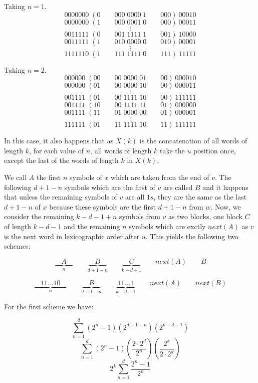 \documentclass[11pt,a4paper]{tesis}
\theoremstyle{definition}
\begin{document}
Taking $n = 1$.
$$0000000\; (0 \qquad 000 \; 0000 \; 1 \qquad 000) \: 00010$$
$$0000000\; (1 \qquad 000 \; 0001 \; 0 \qquad 000) \: 00011$$
$$\vdots$$
$$0011111\; (0 \qquad 001 \; 1111 \; 1 \qquad 001) \: 10000$$
$$0011111\; (1 \qquad 010 \; 0000 \; 0 \qquad 010) \: 00001$$
$$\vdots$$
$$1111110\; (1 \qquad 111 \; 1111 \; 0 \qquad 111) \: 11111$$

Taking $n = 2$.
$$000000\; (00 \qquad 00 \; 0000 \; 01 \qquad 00) \: 000010$$
$$000000\; (01 \qquad 00 \; 0000 \; 10 \qquad 00) \: 000011$$
$$\vdots$$
$$001111\; (01 \qquad 00 \; 1111 \; 10 \qquad 00) \: 111111$$
$$001111\; (10 \qquad 00 \; 1111 \; 11 \qquad 01) \: 000000$$
$$001111\; (11 \qquad 01 \; 0000 \; 00 \qquad 01) \: 000001$$
$$\vdots$$
$$111111\; (01 \qquad 11 \; 1111 \; 10 \qquad 11) \: 111111$$

In this case, it also happens that as $X(k)$ is the concatenation of all words of length $k$, for each value of $n$, 
all words of length $k$ take the $u$ position once, except the last of the words of length $k$ in $X(k)$.

We call $A$ the first $n$ symbols of $x$ which are taken from the end of $v$. The following $d + 1 - n$ symbols which are the first of $v$ are called $B$ and it happens that unless the remaining symbols of $v$ are all $1s$, 
they are the same as the last $d + 1 - n$ of $x$ because these symbols are the first $d + 1 - n$ from $w$.
Now, we consider the remaining $k - d - 1 + n$ symbols from $v$ as two blocks, one block $C$ of length $k - d - 1$ and the remaining $n$ symbols which are exctly $next(A)$ as $v$ is the next word in lexicographic order after $u$.
This yields the following two schemes:

$$\underbrace{\quad A \quad }_{n} \qquad \underbrace{\quad B \quad }_{d + 1 - n}  \qquad \underbrace{\quad C \quad }_{k-d+1} \qquad next(A) \qquad B$$

$$\underbrace{\quad 11\dots10 \quad }_{n} \qquad \underbrace{\quad B \quad }_{d + 1 - n}  \qquad \underbrace{\; 11\dots1 \; }_{k-d+1} \qquad next(A) \qquad next(B)$$

For the first scheme we have:

$$\sum_{n=1}^{d}(2^n - 1) (2^{d + 1 - n}) (2^{k - d - 1})$$
$$\sum_{n=1}^{d}(2^n - 1) (\frac{2 \cdot 2^d}{2^n})     (\frac{2^k}{2 \cdot 2^d})$$
$$ 2^k \sum_{n=1}^{d} \frac{2^n - 1}{2^n} $$

\end{document}
